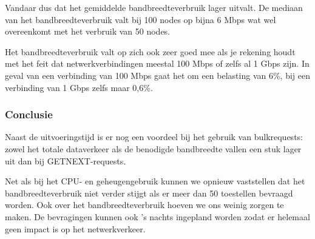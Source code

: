 Vandaar dus dat het gemiddelde bandbreedteverbruik lager uitvalt.
De mediaan van het bandbreedteverbruik valt bij 100 nodes op bijna 6 Mbps wat wel overeenkomt met het verbruik van 50 nodes.

Het bandbreedteverbruik valt op zich ook zeer goed mee als je rekening houdt met het feit dat netwerkverbindingen meestal 100 Mbps of zelfs al 1 Gbps zijn.
In geval van een verbinding van 100 Mbps gaat het om een belasting van 6\%, bij een verbinding van 1 Gbps zelfs maar 0,6\%.

\subsubsection{Conclusie}

Naast de uitvoeringstijd is er nog een voordeel bij het gebruik van bulkrequests:
zowel het totale dataverkeer als de benodigde bandbreedte vallen een stuk lager uit dan bij GETNEXT-requests.

Net als bij het CPU- en geheugengebruik kunnen we opnieuw vaststellen dat het bandbreedteverbruik niet verder stijgt als er meer dan 50 toestellen bevraagd worden.
Ook over het bandbreedteverbruik hoeven we ons weinig zorgen te maken.
De bevragingen kunnen ook 's nachts ingepland worden zodat er helemaal geen impact is op het netwerkverkeer.